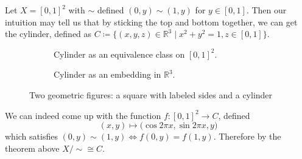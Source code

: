  \begin{example}[Cylinder]
    Let $X = [0, 1]^2$ with $\sim$ defined $(0, y) \sim (1, y)$ for $y \in [0, 1]$. Then our intuition may tell us that by sticking the top and bottom together, we can get the cylinder, defined as $C \coloneqq \{(x, y, z) \in \mathbb{R}^3 \mid x^2 + y^2 = 1, z \in [0,1]\}$.

    \begin{figure}[H]
      \centering
      \begin{subfigure}[b]{0.48\textwidth}
        \centering
        \caption{Cylinder as an equivalence class on $[0, 1]^2$.}
        \label{fig:cylinder_equiv}
      \end{subfigure}
      \hfill 
      \begin{subfigure}[b]{0.48\textwidth}
        \centering
        \caption{Cylinder as an embedding in $\mathbb{R}^3$. }
        \label{fig:cylinder_embed}
      \end{subfigure}
      \caption{Two geometric figures: a square with labeled sides and a cylinder}
      \label{fig:cylinder}
    \end{figure}
    
    We can indeed come up with the function $f: [0, 1]^2 \rightarrow C$, defined
    \begin{equation}
      (x, y) \mapsto \big( \cos{2\pi x}, \sin{2 \pi x}, y \big)
    \end{equation}
    which satisfies $(0, y) \sim (1, y) \iff f(0, y) = f(1, y)$. Therefore by the theorem above $X/{\sim} \cong C$. 
  \end{example}

